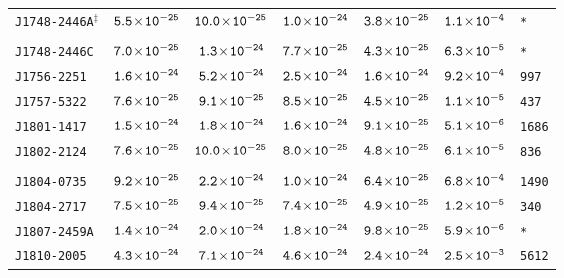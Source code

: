 \begin{longtable}{l | c | c | c | c | c | l}
\scriptsize{\tt{J1748-2446A}$^{\ddagger}$} & \scriptsize{$\tt{5.5\!\times\!10^{-25}}$} &
\scriptsize{$\tt{10.0\!\times\!10^{-25}}$} & \scriptsize{$\tt{1.0\!\times\!10^{-24}}$} & \scriptsize{$\tt{3.8\!\times\!10^{-25}}$}
& \scriptsize{$\tt{1.1\!\times\!10^{-4}}$} & \scriptsize{\tt{*}} \\[-16pt] 
\\[-20pt] 
\scriptsize{\tt{J1748-2446C}} & \scriptsize{$\tt{7.0\!\times\!10^{-25}}$} & \scriptsize{$\tt{1.3\!\times\!10^{-24}}$} & \scriptsize{$\tt{7.7\!\times\!10^{-25}}$} & \scriptsize{$\tt{4.3\!\times\!10^{-25}}$} & \scriptsize{$\tt{6.3\!\times\!10^{-5}}$} & \scriptsize{\tt{*}} \\[-16pt] 
\scriptsize{\tt{J1756-2251}} & \scriptsize{$\tt{1.6\!\times\!10^{-24}}$} & \scriptsize{$\tt{5.2\!\times\!10^{-24}}$} & \scriptsize{$\tt{2.5\!\times\!10^{-24}}$} &\scriptsize{$\tt{1.6\!\times\!10^{-24}}$} & \scriptsize{$\tt{9.2\!\times\!10^{-4}}$} & \scriptsize{\tt{997}} \\[-16pt] 
\scriptsize{\tt{J1757-5322}} & \scriptsize{$\tt{7.6\!\times\!10^{-25}}$} & \scriptsize{$\tt{9.1\!\times\!10^{-25}}$} & \scriptsize{$\tt{8.5\!\times\!10^{-25}}$} &\scriptsize{$\tt{4.5\!\times\!10^{-25}}$} & \scriptsize{$\tt{1.1\!\times\!10^{-5}}$} & \scriptsize{\tt{437}} \\[-16pt] 
\scriptsize{\tt{J1801-1417}} & \scriptsize{$\tt{1.5\!\times\!10^{-24}}$} & \scriptsize{$\tt{1.8\!\times\!10^{-24}}$} & \scriptsize{$\tt{1.6\!\times\!10^{-24}}$} &\scriptsize{$\tt{9.1\!\times\!10^{-25}}$} & \scriptsize{$\tt{5.1\!\times\!10^{-6}}$} & \scriptsize{\tt{1686}} \\[-16pt] 
\scriptsize{\tt{J1802-2124}} & \scriptsize{$\tt{7.6\!\times\!10^{-25}}$} & \scriptsize{$\tt{10.0\!\times\!10^{-25}}$} & \scriptsize{$\tt{8.0\!\times\!10^{-25}}$} &\scriptsize{$\tt{4.8\!\times\!10^{-25}}$} & \scriptsize{$\tt{6.1\!\times\!10^{-5}}$} & \scriptsize{\tt{836}} \\[-16pt] 
\\[-20pt] 
\scriptsize{\tt{J1804-0735}} & \scriptsize{$\tt{9.2\!\times\!10^{-25}}$} & \scriptsize{$\tt{2.2\!\times\!10^{-24}}$} & \scriptsize{$\tt{1.0\!\times\!10^{-24}}$} &\scriptsize{$\tt{6.4\!\times\!10^{-25}}$} & \scriptsize{$\tt{6.8\!\times\!10^{-4}}$} & \scriptsize{\tt{1490}} \\[-16pt] 
\scriptsize{\tt{J1804-2717}} & \scriptsize{$\tt{7.5\!\times\!10^{-25}}$} & \scriptsize{$\tt{9.4\!\times\!10^{-25}}$} & \scriptsize{$\tt{7.4\!\times\!10^{-25}}$} &\scriptsize{$\tt{4.9\!\times\!10^{-25}}$} & \scriptsize{$\tt{1.2\!\times\!10^{-5}}$} & \scriptsize{\tt{340}} \\[-16pt] 
\scriptsize{\tt{J1807-2459A}} & \scriptsize{$\tt{1.4\!\times\!10^{-24}}$} & \scriptsize{$\tt{2.0\!\times\!10^{-24}}$} & \scriptsize{$\tt{1.8\!\times\!10^{-24}}$} & \scriptsize{$\tt{9.8\!\times\!10^{-25}}$} & \scriptsize{$\tt{5.9\!\times\!10^{-6}}$} & \scriptsize{\tt{*}} \\[-16pt] 
\scriptsize{\tt{J1810-2005}} & \scriptsize{$\tt{4.3\!\times\!10^{-24}}$} & \scriptsize{$\tt{7.1\!\times\!10^{-24}}$} & \scriptsize{$\tt{4.6\!\times\!10^{-24}}$} &\scriptsize{$\tt{2.4\!\times\!10^{-24}}$} & \scriptsize{$\tt{2.5\!\times\!10^{-3}}$} & \scriptsize{\tt{5612}} \\[-16pt] 

\end{longtable}
